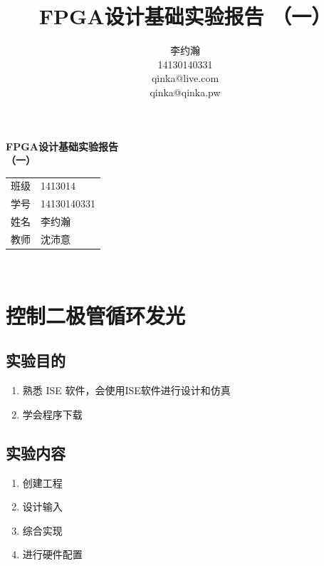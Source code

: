 \documentclass{ctexart}
\author{李约瀚 \\ 14130140331 \\ qinka@live.com \\ qinka@qinka.pw}
\title{FPGA设计基础实验报告 （一）}
\begin{document}
    
        \thispagestyle{empty}
        \begin{center}
            \vspace*{4em}
            {\Huge\textbf{FPGA设计基础实验报告\\\vspace*{0.5em} （一）}}
            \vfill
            \begin{tabular}{c@{：}l}
                班级 & 1413014 \\
                学号 & 14130140331 \\ 
                姓名 & 李约瀚 \\ 
                教师 & 沈沛意 \\
            \end{tabular} 
            \vspace*{4em}\\
        \end{center}
        \newpage
        
       
        \setcounter{page}{0}
        \setcounter{section}{0}

        \section{控制二极管循环发光}
        
        \subsection{实验目的}
        \begin{enumerate}
        \item 熟悉 ISE 软件，会使用ISE软件进行设计和仿真
        \item 学会程序下载
        \end{enumerate}

        \subsection{实验内容}

        \begin{enumerate}
        \item 创建工程
        \item 设计输入
        \item 综合实现
        \item 进行硬件配置
        \end{enumerate}
\end{document}
